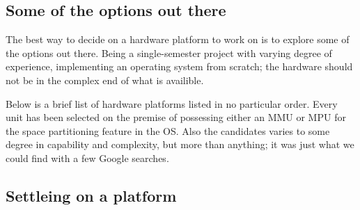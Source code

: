 \subsection{Some of the options out there}
The best way to decide on a hardware platform to work on is to explore some of the options out there.
Being a single-semester project with varying degree of experience,
implementing an operating system from scratch;
the hardware should not be in the complex end of what is availible.

Below is a brief list of hardware platforms listed in no particular order.
Every unit has been selected on the premise of possessing either an MMU or MPU for the space partitioning feature in the OS.
Also the candidates varies to some degree in capability and complexity,
but more than anything; it was just what we could find with a few Google searches.

\subsection{Settleing on a platform}


\section{}

